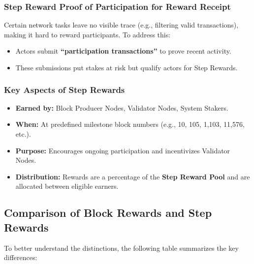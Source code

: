 \documentclass{article}
\begin{document}
\subsubsection{Step Reward Proof of Participation for Reward Receipt}

Certain network tasks leave no visible trace (e.g., filtering valid
transactions), making it hard to reward participants. To address this:
\begin{itemize}
    \item Actors submit \textbf{“participation transactions”} to prove recent activity.
    \item These submissions put stakes at risk but qualify actors for Step Rewards.
\end{itemize}

\subsubsection{Key Aspects of Step Rewards}
\begin{itemize}
    \item \textbf{Earned by:} Block Producer Nodes, Validator Nodes, System Stakers.
    \item \textbf{When:} At predefined milestone block numbers (e.g., 10, 105, 1,103, 11,576, etc.).
    \item \textbf{Purpose:} Encourages ongoing participation and incentivizes Validator Nodes.
    \item \textbf{Distribution:} Rewards are a percentage of the \textbf{Step Reward Pool} and are allocated between eligible earners.
\end{itemize}

\subsection{Comparison of Block Rewards and Step Rewards}

To better understand the distinctions, the following table summarizes the key
differences:
\end{document}
